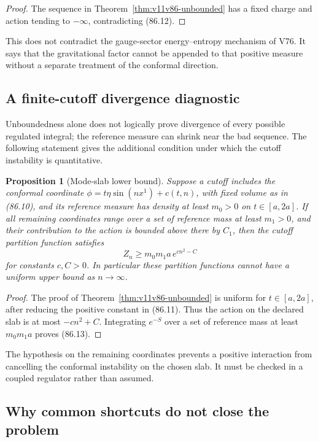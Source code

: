 \documentclass[11pt]{article}
\newtheorem{proposition}[theorem]{Proposition}
\begin{document}
\begin{proof}
The sequence in Theorem~\ref{thm:v11v86-unbounded} has a fixed charge
and action tending to \(-\infty\), contradicting (86.12).
\end{proof}

This does not contradict the gauge-sector energy--entropy mechanism
of V76.  It says that the gravitational factor cannot be appended to
that positive measure without a separate treatment of the conformal
direction.

\subsection{A finite-cutoff divergence diagnostic}

Unboundedness alone does not logically prove divergence of every
possible regulated integral; the reference measure can shrink near
the bad sequence.  The following statement gives the additional
condition under which the cutoff instability is quantitative.

\begin{proposition}[Mode-slab lower bound]
\label{prop:v11v86-slab}
Suppose a cutoff includes the conformal coordinate
\(\phi=t\eta\sin(nx^1)+c(t,n)\), with fixed volume as in (86.10), and
its reference measure has density at least \(m_0>0\) on
\(t\in[a,2a]\).  If all remaining coordinates range over a set of
reference mass at least \(m_1>0\), and their contribution to the
action is bounded above there by \(C_1\), then the cutoff partition
function satisfies
\[
                         Z_n\ge m_0m_1a\,
                         e^{c n^2-C}                         \tag{86.13}
\]
for constants \(c,C>0\).  In particular these partition functions
cannot have a uniform upper bound as \(n\to\infty\).
\end{proposition}

\begin{proof}
The proof of Theorem~\ref{thm:v11v86-unbounded} is uniform for
\(t\in[a,2a]\), after reducing the positive constant in (86.11).
Thus the action on the declared slab is at most \(-cn^2+C\).
Integrating \(e^{-S}\) over a set of reference mass at least
\(m_0m_1a\) proves (86.13).
\end{proof}

The hypothesis on the remaining coordinates prevents a positive
interaction from cancelling the conformal instability on the chosen
slab.  It must be checked in a coupled regulator rather than assumed.

\subsection{Why common shortcuts do not close the problem}
\end{document}

